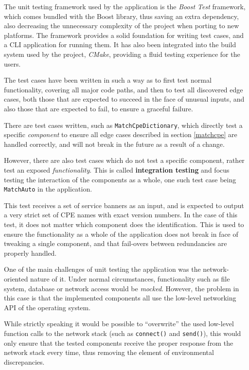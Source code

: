 \documentclass[a4paper,12pt]{article}
\begin{document}
	The unit testing framework used by the application is the \textit{Boost Test} framework, which comes bundled with the Boost library, thus saving an extra dependency, also decreasing the unnecessary complexity of the project when porting to new platforms. The framework provides a solid foundation for writing test cases, and a CLI application for running them. It has also been integrated into the build system used by the project, \textit{CMake}, providing a fluid testing experience for the users.
	
	The test cases have been written in such a way as to first test normal functionality, covering all major code paths, and then to test all discovered edge cases, both those that are expected to succeed in the face of unusual inputs, and also those that are expected to fail, to ensure a graceful failure.
	
	There are test cases written, such as \texttt{MatchCpeDictionary}, which directly test a specific \textit{component} to ensure all edge cases described in section \ref{matchcpe} are handled correctly, and will not break in the future as a result of a change.
	
	However, there are also test cases which do not test a specific component, rather test an exposed \textit{functionality}. This is called \textbf{integration testing}\cite{reddy11} and focus testing the interaction of the components as a whole, one such test case being \texttt{MatchAuto} in the application.
	
	This test receives a set of service banners as an input, and is expected to output a very strict set of CPE names with exact version numbers. In the case of this test, it does not matter which component does the identification. This is used to ensure the functionality as a whole of the application does not break in face of tweaking a single component, and that fail-overs between redundancies are properly handled.
	
	One of the main challenges of unit testing the application was the network-oriented nature of it. Under normal circumstances, functionality such as file system, database or network access would be \textit{mocked}\cite{hamill04}. However, the problem in this case is that the implemented components all use the low-level networking API of the operating system.
	
	While strictly speaking it would be possible to ``overwrite'' the used low-level function calls to the network stack (such as \texttt{connect()} and \texttt{send()}), this would only ensure that the tested components receive the proper response from the network stack every time, thus removing the element of environmental discrepancies.
	
\end{document}
